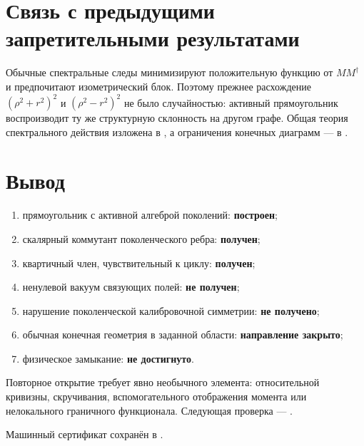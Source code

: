 \section{Связь с предыдущими запретительными результатами}

Обычные спектральные следы минимизируют положительную функцию от
\(MM^\dagger\) и предпочитают изометрический блок. Поэтому прежнее
расхождение \((\rho^2+r^2)^2\) и \((\rho^2-r^2)^2\) не было случайностью:
активный прямоугольник воспроизводит ту же структурную склонность на другом
графе. Общая теория спектрального действия изложена в
, а ограничения конечных диаграмм --- в
.

\section{Вывод}

\begin{protocol}
\begin{enumerate}
 \item прямоугольник с активной алгеброй поколений: \textbf{построен};
 \item скалярный коммутант поколенческого ребра: \textbf{получен};
 \item квартичный член, чувствительный к циклу: \textbf{получен};
 \item ненулевой вакуум связующих полей: \textbf{не получен};
 \item нарушение поколенческой калибровочной симметрии:
 \textbf{не получено};
 \item обычная конечная геометрия в заданной области:
 \textbf{направление закрыто};
 \item физическое замыкание: \textbf{не достигнуто}.
\end{enumerate}
\end{protocol}

Повторное открытие требует явно необычного элемента: относительной
кривизны, скручивания, вспомогательного отображения момента или нелокального
граничного функционала. Следующая проверка ---
.

Машинный сертификат сохранён в
.